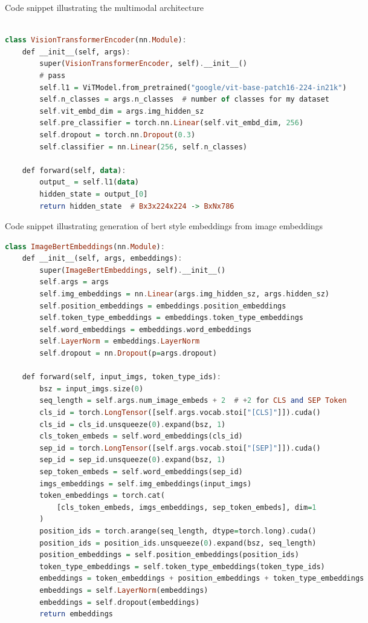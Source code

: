 \begin{listing}%
\caption{Code snippet illustrating the multimodal architecture}%
\label{lst:listing}%
\begin{lstlisting}[language=Haskell]

class VisionTransformerEncoder(nn.Module):
    def __init__(self, args):
        super(VisionTransformerEncoder, self).__init__()
        # pass
        self.l1 = ViTModel.from_pretrained("google/vit-base-patch16-224-in21k")
        self.n_classes = args.n_classes  # number of classes for my dataset
        self.vit_embd_dim = args.img_hidden_sz
        self.pre_classifier = torch.nn.Linear(self.vit_embd_dim, 256)
        self.dropout = torch.nn.Dropout(0.3)
        self.classifier = nn.Linear(256, self.n_classes)

    def forward(self, data):
        output_ = self.l1(data)
        hidden_state = output_[0]
        return hidden_state  # Bx3x224x224 -> BxNx786

\end{lstlisting}
\end{listing}

\begin{listing}%
\caption{Code snippet illustrating generation of bert style embeddings from image embeddings}%
\label{lst:listing}%
\begin{lstlisting}[language=Haskell]
class ImageBertEmbeddings(nn.Module):
    def __init__(self, args, embeddings):
        super(ImageBertEmbeddings, self).__init__()
        self.args = args
        self.img_embeddings = nn.Linear(args.img_hidden_sz, args.hidden_sz)
        self.position_embeddings = embeddings.position_embeddings
        self.token_type_embeddings = embeddings.token_type_embeddings
        self.word_embeddings = embeddings.word_embeddings
        self.LayerNorm = embeddings.LayerNorm
        self.dropout = nn.Dropout(p=args.dropout)

    def forward(self, input_imgs, token_type_ids):
        bsz = input_imgs.size(0)
        seq_length = self.args.num_image_embeds + 2  # +2 for CLS and SEP Token
        cls_id = torch.LongTensor([self.args.vocab.stoi["[CLS]"]]).cuda()
        cls_id = cls_id.unsqueeze(0).expand(bsz, 1)
        cls_token_embeds = self.word_embeddings(cls_id)
        sep_id = torch.LongTensor([self.args.vocab.stoi["[SEP]"]]).cuda()
        sep_id = sep_id.unsqueeze(0).expand(bsz, 1)
        sep_token_embeds = self.word_embeddings(sep_id)
        imgs_embeddings = self.img_embeddings(input_imgs)
        token_embeddings = torch.cat(
            [cls_token_embeds, imgs_embeddings, sep_token_embeds], dim=1
        )
        position_ids = torch.arange(seq_length, dtype=torch.long).cuda()
        position_ids = position_ids.unsqueeze(0).expand(bsz, seq_length)
        position_embeddings = self.position_embeddings(position_ids)
        token_type_embeddings = self.token_type_embeddings(token_type_ids)
        embeddings = token_embeddings + position_embeddings + token_type_embeddings
        embeddings = self.LayerNorm(embeddings)
        embeddings = self.dropout(embeddings)
        return embeddings

\end{lstlisting}
\end{listing}

